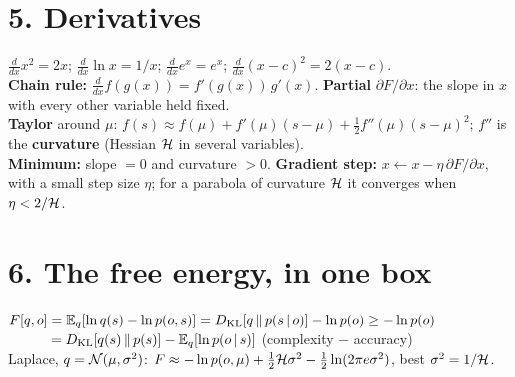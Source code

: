 \documentclass[10pt]{article}
\begin{document}
\section*{5. Derivatives}
$\frac{d}{dx}x^2 = 2x$;\; $\frac{d}{dx}\ln x = 1/x$;\; $\frac{d}{dx}e^{x} = e^{x}$;\;
$\frac{d}{dx}(x-c)^2 = 2(x-c)$.\\
\textbf{Chain rule:} $\frac{d}{dx}f(g(x)) = f'(g(x))\,g'(x)$.\;
\textbf{Partial} $\partial F/\partial x$: the slope in $x$ with every other variable held fixed.\\
\textbf{Taylor} around $\mu$: $f(s) \approx f(\mu) + f'(\mu)(s-\mu) + \tfrac12 f''(\mu)(s-\mu)^2$;\;
$f''$ is the \textbf{curvature} (Hessian $\mathcal{H}$ in several variables).\\
\textbf{Minimum:} slope $= 0$ and curvature $> 0$.\;
\textbf{Gradient step:} $x \leftarrow x - \eta\,\partial F/\partial x$, with a small step size $\eta$;
for a parabola of curvature $\mathcal{H}$ it converges when $\eta < 2/\mathcal{H}$.

\section*{6. The free energy, in one box}
\begin{keyidea}\small
$F[q,o] = \mathbb{E}_q[\ln q(s) - \ln p(o,s)] = D_{\mathrm{KL}}\!\left[q\,\middle\|\,p(s\,|\, o)\right] - \ln p(o) \ge -\ln p(o)$\\[2pt]
$\phantom{F[q,o]} = D_{\mathrm{KL}}\!\left[q(s)\,\middle\|\,p(s)\right] - \mathbb{E}_q[\ln p(o\,|\, s)]$ \;(complexity $-$ accuracy)\\[2pt]
Laplace, $q = \mathcal{N}(\mu,\sigma^2)$: $F \approx -\ln p(o,\mu) + \tfrac12\mathcal{H}\sigma^2 - \tfrac12\ln(2\pi e\sigma^2)$, best $\sigma^2 = 1/\mathcal{H}$.
\end{keyidea}
\end{document}
